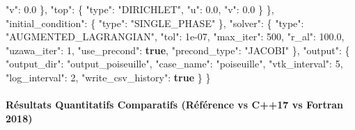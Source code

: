 \documentclass[
  10pt,
]{article}
\newenvironment{Shaded}{}{}
\newcommand{\DataTypeTok}[1]{\textcolor[rgb]{0.56,0.13,0.00}{#1}}
\newcommand{\DecValTok}[1]{\textcolor[rgb]{0.25,0.63,0.44}{#1}}
\newcommand{\FloatTok}[1]{\textcolor[rgb]{0.25,0.63,0.44}{#1}}
\newcommand{\FunctionTok}[1]{\textcolor[rgb]{0.02,0.16,0.49}{#1}}
\newcommand{\KeywordTok}[1]{\textcolor[rgb]{0.00,0.44,0.13}{\textbf{#1}}}
\newcommand{\StringTok}[1]{\textcolor[rgb]{0.25,0.44,0.63}{#1}}
\begin{document}
\begin{Shaded}
\begin{Highlighting}[]
      \DataTypeTok{"v"}\FunctionTok{:} \FloatTok{0.0}
    \FunctionTok{\},}
    \DataTypeTok{"top"}\FunctionTok{:} \FunctionTok{\{}
      \DataTypeTok{"type"}\FunctionTok{:} \StringTok{"DIRICHLET"}\FunctionTok{,}
      \DataTypeTok{"u"}\FunctionTok{:} \FloatTok{0.0}\FunctionTok{,}
      \DataTypeTok{"v"}\FunctionTok{:} \FloatTok{0.0}
    \FunctionTok{\}}
  \FunctionTok{\},}
  \DataTypeTok{"initial\_condition"}\FunctionTok{:} \FunctionTok{\{}
    \DataTypeTok{"type"}\FunctionTok{:} \StringTok{"SINGLE\_PHASE"}
  \FunctionTok{\},}
  \DataTypeTok{"solver"}\FunctionTok{:} \FunctionTok{\{}
    \DataTypeTok{"type"}\FunctionTok{:} \StringTok{"AUGMENTED\_LAGRANGIAN"}\FunctionTok{,}
    \DataTypeTok{"tol"}\FunctionTok{:} \DecValTok{1e{-}07}\FunctionTok{,}
    \DataTypeTok{"max\_iter"}\FunctionTok{:} \DecValTok{500}\FunctionTok{,}
    \DataTypeTok{"r\_al"}\FunctionTok{:} \FloatTok{100.0}\FunctionTok{,}
    \DataTypeTok{"uzawa\_iter"}\FunctionTok{:} \DecValTok{1}\FunctionTok{,}
    \DataTypeTok{"use\_precond"}\FunctionTok{:} \KeywordTok{true}\FunctionTok{,}
    \DataTypeTok{"precond\_type"}\FunctionTok{:} \StringTok{"JACOBI"}
  \FunctionTok{\},}
  \DataTypeTok{"output"}\FunctionTok{:} \FunctionTok{\{}
    \DataTypeTok{"output\_dir"}\FunctionTok{:} \StringTok{"output\_poiseuille"}\FunctionTok{,}
    \DataTypeTok{"case\_name"}\FunctionTok{:} \StringTok{"poiseuille"}\FunctionTok{,}
    \DataTypeTok{"vtk\_interval"}\FunctionTok{:} \DecValTok{5}\FunctionTok{,}
    \DataTypeTok{"log\_interval"}\FunctionTok{:} \DecValTok{2}\FunctionTok{,}
    \DataTypeTok{"write\_csv\_history"}\FunctionTok{:} \KeywordTok{true}
  \FunctionTok{\}}
\FunctionTok{\}}
\end{Highlighting}
\end{Shaded}

\paragraph{Résultats Quantitatifs Comparatifs (Référence vs C++17 vs
Fortran
2018)}\label{ruxe9sultats-quantitatifs-comparatifs-ruxe9fuxe9rence-vs-c17-vs-fortran-2018-1}
\end{document}
